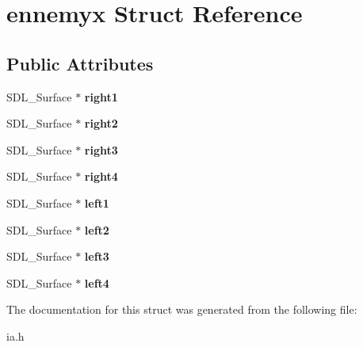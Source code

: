 \hypertarget{structennemyx}{}\section{ennemyx Struct Reference}
\label{structennemyx}
\subsection*{Public Attributes}
\begin{DoxyCompactItemize}
\item 
\mbox{\label{structennemyx_ad2a12aa07cad08723a63574c1f2ebd07}} 
S\+D\+L\+\_\+\+Surface $\ast$ {\bfseries right1}
\item 
\mbox{\label{structennemyx_ace9895186ea99359152696520fa22247}} 
S\+D\+L\+\_\+\+Surface $\ast$ {\bfseries right2}
\item 
\mbox{\label{structennemyx_ae9f0674de0f5b27b7c26ec7c9e5e2be4}} 
S\+D\+L\+\_\+\+Surface $\ast$ {\bfseries right3}
\item 
\mbox{\label{structennemyx_a22cf0fc6fefe2676dc0a14e18931f3bd}} 
S\+D\+L\+\_\+\+Surface $\ast$ {\bfseries right4}
\item 
\mbox{\label{structennemyx_a913b4f00a14d849e0369385ad162e88b}} 
S\+D\+L\+\_\+\+Surface $\ast$ {\bfseries left1}
\item 
\mbox{\label{structennemyx_a49303d5596d7d0cf9d14338b83f755c0}} 
S\+D\+L\+\_\+\+Surface $\ast$ {\bfseries left2}
\item 
\mbox{\label{structennemyx_ae414742c72e450d88af5f4af4782b687}} 
S\+D\+L\+\_\+\+Surface $\ast$ {\bfseries left3}
\item 
\mbox{\label{structennemyx_a07dc2a14cadfc08084accc4791b35354}} 
S\+D\+L\+\_\+\+Surface $\ast$ {\bfseries left4}
\end{DoxyCompactItemize}


The documentation for this struct was generated from the following file\+:\begin{DoxyCompactItemize}
\item 
ia.\+h\end{DoxyCompactItemize}

